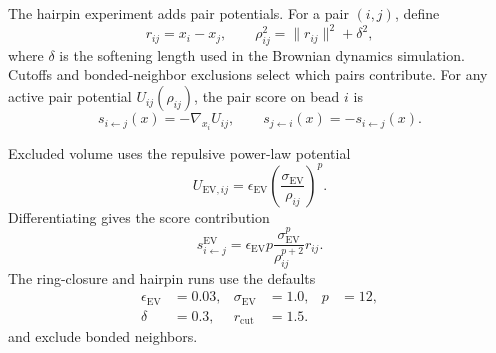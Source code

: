 \documentclass[reprint,amsmath,amssymb,aps,pra,10pt]{revtex4-2}
\begin{document}
The hairpin experiment adds pair potentials.
For a pair $(i,j)$, define
\begin{equation}
    r_{ij}=x_i-x_j,
    \qquad
    \rho_{ij}^2
    =
    \|r_{ij}\|^2+\delta^2,
\end{equation}
where $\delta$ is the softening length used in the Brownian dynamics simulation.
Cutoffs and bonded-neighbor exclusions select which pairs contribute.
For any active pair potential $U_{ij}(\rho_{ij})$, the pair score on bead $i$ is
\begin{equation}
    s_{i\leftarrow j}(x)
    =
    -\nabla_{x_i}U_{ij},
    \qquad
    s_{j\leftarrow i}(x)
    =
    -s_{i\leftarrow j}(x).
\end{equation}

Excluded volume uses the repulsive power-law potential
\begin{equation}
    U_{\mathrm{EV},ij}
    =
    \epsilon_{\mathrm{EV}}
    \left(
        \frac{\sigma_{\mathrm{EV}}}
             {\rho_{ij}}
    \right)^p.
\end{equation}
Differentiating gives the score contribution
\begin{equation}
    s^{\mathrm{EV}}_{i\leftarrow j}
    =
    \epsilon_{\mathrm{EV}}
    p
    \frac{\sigma_{\mathrm{EV}}^p}
         {\rho_{ij}^{p+2}}
    r_{ij}.
\end{equation}
The ring-closure and hairpin runs use the defaults
\begin{equation}
    \begin{aligned}
        \epsilon_{\mathrm{EV}}
        &=
        0.03,
        &
        \sigma_{\mathrm{EV}}
        &=
        1.0,
        &
        p
        &=
        12,
        \\
        \delta
        &=
        0.3,
        &
        r_{\mathrm{cut}}
        &=
        1.5.
    \end{aligned}
\end{equation}
and exclude bonded neighbors.
\end{document}
